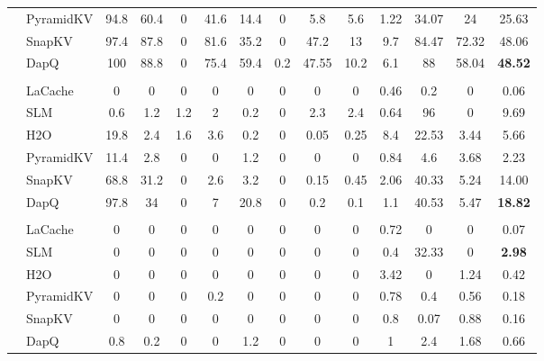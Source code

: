 \begin{table}[t]
{\begin{tabular}{>{\bfseries}c >{\raggedright}p{2.2cm} *{12}{c}}
& PyramidKV & 94.8 & 60.4 & 0 & 41.6 & 14.4 & 0 & 5.8 & 5.6 & 1.22 & 34.07 & 24 & 25.63 \\
& SnapKV & 97.4 & 87.8 & 0 & 81.6 & 35.2 & 0 & 47.2 & 13 & 9.7 & 84.47 & 72.32 & 48.06 \\
& DapQ & 100 & 88.8 & 0 & 75.4 & 59.4 & 0.2 & 47.55 & 10.2 & 6.1 & 88 & 58.04 & \textbf{48.52} \\
& \multicolumn{13}{c}{\cellcolor{gray!20}\textbf{KV Cache Size = 128}} \\
& LaCache & 0 & 0 & 0 & 0 & 0 & 0 & 0 & 0 & 0.46 & 0.2 & 0 & 0.06 \\
& SLM & 0.6 & 1.2 & 1.2 & 2 & 0.2 & 0 & 2.3 & 2.4 & 0.64 & 96 & 0 & 9.69 \\
& H2O & 19.8 & 2.4 & 1.6 & 3.6 & 0.2 & 0 & 0.05 & 0.25 & 8.4 & 22.53 & 3.44 & 5.66 \\
& PyramidKV & 11.4 & 2.8 & 0 & 0 & 1.2 & 0 & 0 & 0 & 0.84 & 4.6 & 3.68 & 2.23 \\
& SnapKV & 68.8 & 31.2 & 0 & 2.6 & 3.2 & 0 & 0.15 & 0.45 & 2.06 & 40.33 & 5.24 & 14.00 \\
& DapQ & 97.8 & 34 & 0 & 7 & 20.8 & 0 & 0.2 & 0.1 & 1.1 & 40.53 & 5.47 & \textbf{18.82} \\
& \multicolumn{13}{c}{\cellcolor{gray!20}\textbf{KV Cache Size = 64}} \\
& LaCache & 0 & 0 & 0 & 0 & 0 & 0 & 0 & 0 & 0.72 & 0 & 0 & 0.07 \\
& SLM & 0 & 0 & 0 & 0 & 0 & 0 & 0 & 0 & 0.4 & 32.33 & 0 & \textbf{2.98} \\
& H2O & 0 & 0 & 0 & 0 & 0 & 0 & 0 & 0 & 3.42 & 0 & 1.24 & 0.42 \\
& PyramidKV & 0 & 0 & 0 & 0.2 & 0 & 0 & 0 & 0 & 0.78 & 0.4 & 0.56 & 0.18 \\
& SnapKV & 0 & 0 & 0 & 0 & 0 & 0 & 0 & 0 & 0.8 & 0.07 & 0.88 & 0.16 \\
& DapQ & 0.8 & 0.2 & 0 & 0 & 1.2 & 0 & 0 & 0 & 1 & 2.4 & 1.68 & 0.66 \\
\bottomrule
\end{tabular}
}
\label{table:ruler_qwen3}
\end{table}

% 
